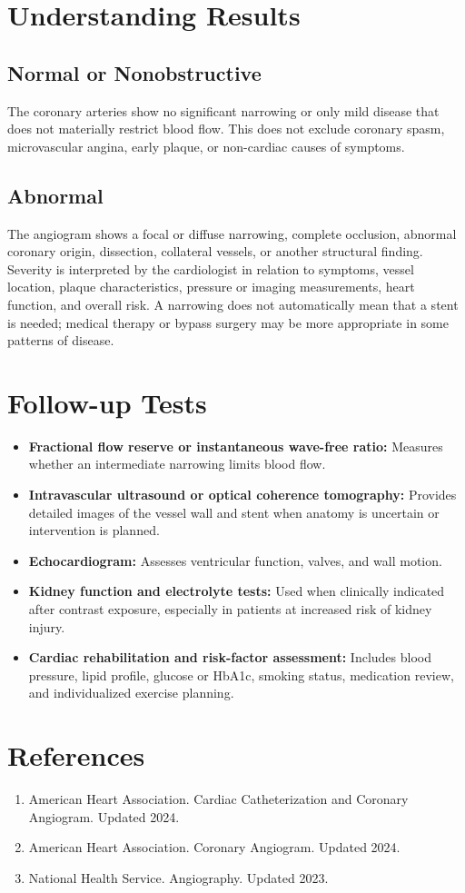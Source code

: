 \section*{Understanding Results}

\subsection*{Normal or Nonobstructive}
The coronary arteries show no significant narrowing or only mild disease that does not materially restrict blood flow. This does not exclude coronary spasm, microvascular angina, early plaque, or non-cardiac causes of symptoms.

\subsection*{Abnormal}
The angiogram shows a focal or diffuse narrowing, complete occlusion, abnormal coronary origin, dissection, collateral vessels, or another structural finding. Severity is interpreted by the cardiologist in relation to symptoms, vessel location, plaque characteristics, pressure or imaging measurements, heart function, and overall risk. A narrowing does not automatically mean that a stent is needed; medical therapy or bypass surgery may be more appropriate in some patterns of disease.

\section*{Follow-up Tests}
\begin{itemize}
  \item \textbf{Fractional flow reserve or instantaneous wave-free ratio:} Measures whether an intermediate narrowing limits blood flow.
  \item \textbf{Intravascular ultrasound or optical coherence tomography:} Provides detailed images of the vessel wall and stent when anatomy is uncertain or intervention is planned.
  \item \textbf{Echocardiogram:} Assesses ventricular function, valves, and wall motion.
  \item \textbf{Kidney function and electrolyte tests:} Used when clinically indicated after contrast exposure, especially in patients at increased risk of kidney injury.
  \item \textbf{Cardiac rehabilitation and risk-factor assessment:} Includes blood pressure, lipid profile, glucose or HbA1c, smoking status, medication review, and individualized exercise planning.
\end{itemize}

\section*{References}
\begin{enumerate}
  \item American Heart Association. Cardiac Catheterization and Coronary Angiogram. Updated 2024.
  \item American Heart Association. Coronary Angiogram. Updated 2024.
  \item National Health Service. Angiography. Updated 2023.
\end{enumerate}

\clearpage
